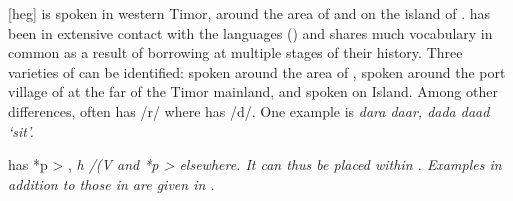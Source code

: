  [heg] is spoken in western Timor,
around the area of 
and on the island of .
 has been in extensive contact with the 
languages () and shares much vocabulary in
common as a result of borrowing
at multiple stages of their history.
Three varieties of  can be identified:   spoken
around the area of  \citep{Edwards2018b},
  spoken around the port village of  at the far
 of the Timor mainland,
and   spoken on  Island.
Among other differences,  often has /r/
where  has /d/. One example is 
\it{dara {\tl} daar},  \it{dada {\tl} daad} ‘sit’.

 has *p > {\0}, \it{h} /(V
and *p > {\0} elsewhere.
It can thus be placed within .
Examples in addition to those in 
are given in .


